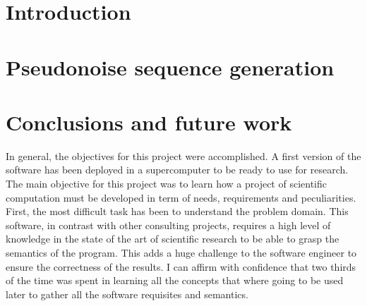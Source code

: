 \documentclass{tfg_domingo}
\begin{document}

\portada
\frontmatter
\gracias{}
\resumen{}{}
\tableofcontents

\mainmatter


\chapter{Introduction}



\chapter{Pseudonoise sequence generation}










\chapter{Conclusions and future work}

  In general, the objectives for this project were  accomplished. A first version of the software has been deployed in a supercomputer to be ready to use for research. The main objective  for this project was to learn how a project of scientific   computation must be developed in term of  needs, requirements and peculiarities.\\

  First, the most difficult task has been to understand
  the problem domain. This software, in contrast with other consulting
  projects, requires a high level of knowledge in the state of the art of scientific research to be
  able to grasp the semantics of the program. This adds a huge challenge to
  the software engineer to ensure the correctness of the results. I can affirm with confidence that
  two thirds of the time was spent in learning all the concepts that where
  going to be used later to gather all the software requisites and semantics.\\
\end{document}
